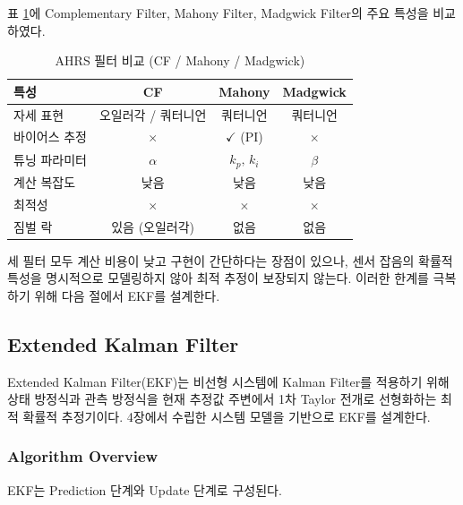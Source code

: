 표 \ref{tab:filter_comparison_simple}에 Complementary Filter,
Mahony Filter, Madgwick Filter의 주요 특성을 비교하였다.

\begin{table}[H]
    \centering
    \caption{AHRS 필터 비교 (CF / Mahony / Madgwick)}
    \label{tab:filter_comparison_simple}
    \begin{tabular}{lccc}
        \toprule
        특성 & CF & Mahony & Madgwick \\
        \midrule
        자세 표현 & 오일러각 / 쿼터니언 & 쿼터니언 & 쿼터니언 \\
        바이어스 추정 & $\times$ & $\checkmark$ (PI) & $\times$ \\
        튜닝 파라미터 & $\alpha$ & $k_p,\, k_i$ & $\beta$ \\
        계산 복잡도 & 낮음 & 낮음 & 낮음 \\
        최적성 & $\times$ & $\times$ & $\times$ \\
        짐벌 락 & 있음 (오일러각) & 없음 & 없음 \\
        \bottomrule
    \end{tabular}
\end{table}

세 필터 모두 계산 비용이 낮고 구현이 간단하다는 장점이 있으나,
센서 잡음의 확률적 특성을 명시적으로 모델링하지 않아 최적 추정이 보장되지 않는다.
이러한 한계를 극복하기 위해 다음 절에서 EKF를 설계한다.

\subsection{Extended Kalman Filter}

Extended Kalman Filter(EKF)는 비선형 시스템에 Kalman Filter를 적용하기 위해
상태 방정식과 관측 방정식을 현재 추정값 주변에서 1차 Taylor 전개로 선형화하는
최적 확률적 추정기이다.
4장에서 수립한 시스템 모델을 기반으로 EKF를 설계한다.

\subsubsection{Algorithm Overview}

EKF는 Prediction 단계와 Update 단계로 구성된다.

